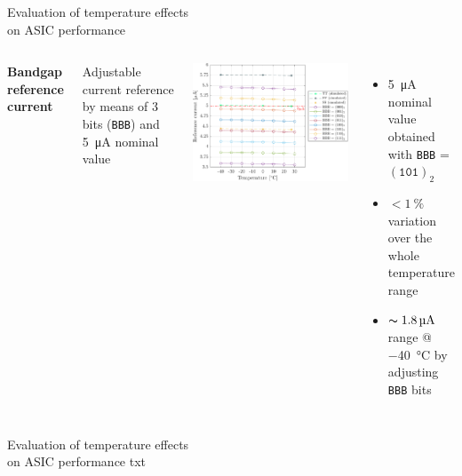 \documentclass[aspectratio=169,xcolor=dvipsnames]{beamer}
\newcommand{\greencheck}{{\color{ForestGreen}\checkmark}}
\begin{document}
\begin{frame}{\vspace{-0.3cm} Evaluation of temperature effects \\ \vskip-0.15cm on ASIC performance}
\begin{columns}[T]
        \addtolength{\leftmargini}{\labelsep}
        \vskip0.3cm
        \textbf{Bandgap reference current}\\
        \vskip0.15cm
    
        Adjustable current reference by means of 3 bits (\texttt{BBB}) and \SI{5}{\micro\ampere} nominal value

        \vskip-0.4cm
        \begin{center}
            \includegraphics[height=0.48\textheight]{images/temperature_effects/BGR_current_Xtemp_all-BBB.pdf}
        \end{center}

        \vskip-0.2cm
        \begin{itemize}
            \item \SI{5}{\micro\ampere} nominal value obtained with \texttt{BBB} = $(\texttt{101})_{2}$ \greencheck
            \item $< \SI{1}{\percent}$ variation over the whole temperature range \greencheck
            \item $\thicksim \SI{1.8}{\micro\ampere}$ range @ \SI{-40}{\celsius} by adjusting \texttt{BBB} bits \greencheck
        \end{itemize}
    
    \end{columns}
\end{frame}

\begin{frame}{\vspace{-0.3cm}Evaluation of temperature effects \\ \vskip-0.15cm on ASIC performance}
    txt
\end{frame}
\end{document}
